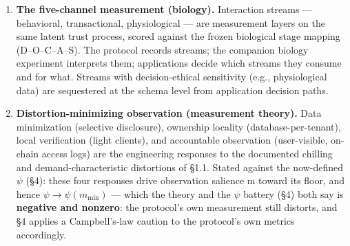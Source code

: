 \documentclass[11pt,twocolumn]{article}
\begin{document}
\begin{enumerate}
  with \(\lambda^{+}\), \(\lambda^{-}\) \(\geq 0\) the
  confirmation/betrayal sensitivities, \(r_t\) \(\in\) {[}0,1{]} the
  recognition gate, \(\delta_S\) \(\geq 0\) the retention leak, and
  \(S_{\mathrm{base}}\) the baseline; \(\varepsilon\) is dimensionless
  after per-domain normalization (\(\tilde{\varepsilon}\) = (V \(-\)
  \(E)/s_d\), \(s_d\) the RMSE of the domain's expectation distribution,
  companion theory preprint, Def. 2a). The named layer presets are: the physics layer
  (\(r = 1,\) \(\delta_S = 0,\) \(\lambda^{+} = \lambda^{-} = \lambda\)
  --- the Rescorla--Wagner limit, reducing exactly to
  \(\Delta S_t = \lambda (V_t\) \(-\) \(E_t\))); the biological
  layer (gating \(r_t\), baseline-restoring leak \(\delta_S > 0,\)
  \(S_{\mathrm{base}}\) the homeostatic prior); and the \textbf{TFP
  protocol layer (\(\lambda^{-} > \lambda^{+}\) --- break/build
  asymmetry: betrayal updates faster than confirmation accrues --- as an
  explicitly labeled extension)}, with \(r_t \equiv 1\) and \(\delta_S\)
  \(\geq 0.\) The protocol therefore treats validation as a primitive: a
  typed, timestamped, attributable event with an expectation field and
  an outcome field. Domains differ only in what fills those fields.
\item
  \textbf{The five-channel measurement (biology).} Interaction streams ---
  behavioral, transactional, physiological --- are measurement layers on
  the same latent trust process, scored against the frozen biological stage
  mapping (D--O--C--A--S). The protocol records streams; the companion biology
  experiment interprets them; applications decide which streams they
  consume and for what. Streams with decision-ethical sensitivity (e.g.,
  physiological data) are sequestered at the schema level from
  application decision paths.
\item
  \textbf{Distortion-minimizing observation (measurement theory).} Data
  minimization (selective disclosure), ownership locality
  (database-per-tenant), local verification (light clients), and
  accountable observation (user-visible, on-chain access logs) are the
  engineering responses to the documented chilling and
  demand-characteristic distortions of §1.1. Stated against the
  now-defined \(\psi\) (§4): these four responses drive observation
  salience m toward its floor, and hence
  \(\psi \to \psi (m_{\mathrm{min}})\) --- which the theory and the
  \(\psi\) battery (§4) both say is \textbf{negative and nonzero}: the
  protocol's own measurement still distorts, and §4 applies a
  Campbell's-law caution to the protocol's own metrics accordingly.
\end{enumerate}
\end{document}
